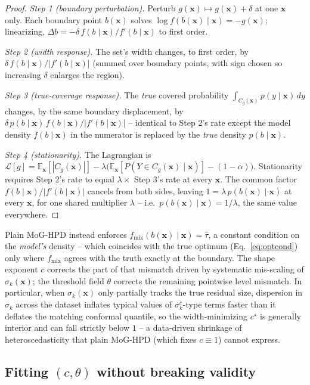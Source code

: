 \documentclass[11pt]{article}
\begin{document}
\begin{proof}
\emph{Step 1 (boundary perturbation).} Perturb $g(\bm x)\mapsto g(\bm x)+\delta$ at one $\bm x$
only. Each boundary point $b(\bm x)$ solves $\log f(b(\bm x)\mid\bm x)=-g(\bm x)$; linearizing,
$\Delta b = -\delta\, f(b\mid\bm x)/f'(b\mid\bm x)$ to first order.

\emph{Step 2 (width response).} The set's width changes, to first order, by
$\delta\, f(b\mid\bm x)/|f'(b\mid\bm x)|$ (summed over boundary points, with sign chosen so
increasing $\delta$ enlarges the region).

\emph{Step 3 (true-coverage response).} The \emph{true} covered probability
$\int_{C_g(\bm x)} p(y\mid\bm x)\,dy$ changes, by the same boundary displacement, by $\delta\,
p(b\mid\bm x)\, f(b\mid\bm x)/|f'(b\mid\bm x)|$ -- identical to Step 2's rate except the model
density $f(b\mid\bm x)$ in the numerator is replaced by the \emph{true} density $p(b\mid\bm x)$.

\emph{Step 4 (stationarity).} The Lagrangian is $\mathcal L[g] = \mathbb E_{\bm x}[|C_g(\bm x)|] -
\lambda\big(\mathbb E_{\bm x}[P(Y\in C_g(\bm x)\mid\bm x)] - (1-\alpha)\big)$. Stationarity requires
Step 2's rate to equal $\lambda\times$ Step 3's rate at every $\bm x$. The common factor
$f(b\mid\bm x)/|f'(b\mid\bm x)|$ cancels from both sides, leaving $1 = \lambda\, p(b(\bm x)\mid\bm
x)$ at every $\bm x$, for one shared multiplier $\lambda$ -- i.e.\ $p(b(\bm x)\mid\bm x) =
1/\lambda$, the same value everywhere.
\end{proof}

Plain MoG-HPD instead enforces $f_{\mathrm{mix}}(b(\bm x)\mid\bm x) = \hat\tau$, a constant
condition on the \emph{model's} density -- which coincides with the true optimum
(Eq.~\ref{eq:optcond}) only where $f_{\mathrm{mix}}$ agrees with the truth exactly at the
boundary. The shape exponent $c$ corrects the part of that mismatch driven by systematic
mis-scaling of $\sigma_k(\bm x)$; the threshold field $\theta$ corrects the remaining pointwise
level mismatch. In particular, when $\sigma_k(\bm x)$ only partially tracks the true residual size,
dispersion in $\sigma_k$ across the dataset inflates typical values of $\sigma_k^{c}$-type terms
faster than it deflates the matching conformal quantile, so the width-minimizing $c^\star$ is
generally interior and can fall strictly below $1$ -- a data-driven shrinkage of heteroscedasticity
that plain MoG-HPD (which fixes $c\equiv1$) cannot express.

\subsection{Fitting $(c,\theta)$ without breaking validity}
\label{sec:stafit}
\end{document}
